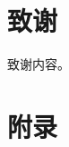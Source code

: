 \documentclass{EvilStyle}
\begin{document}




\section*{致谢}

致谢内容。


\nocite{*}






\appendix

\section{附录}
\end{document}
